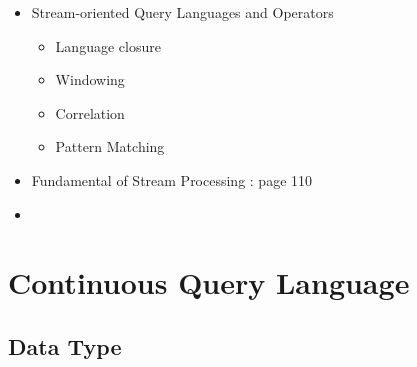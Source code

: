 \begin{itemize}
\item Stream-oriented Query Languages and Operators
	\begin{itemize}
		\item Language closure
		\item Windowing
		\item Correlation
		\item Pattern Matching
	\end{itemize}
	
\item Fundamental of Stream Processing : page 110
\item 
\end{itemize}


\section{Continuous Query Language}


\subsection{Data Type}


